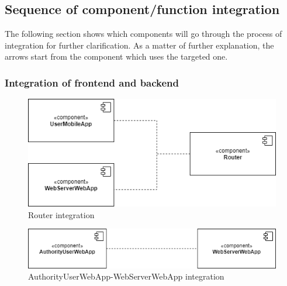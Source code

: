         \subsection{Sequence of component/function integration}
        The following section shows which components will go through the process
        of integration for further clarification. As a matter of further
        explanation, the arrows start from the component which uses the targeted
        one.

        \subsubsection{Integration of frontend and backend}
            \begin{figure}[H]
                \includegraphics[scale=0.7]{dd/resources/images/Integration-Router.png}
                \caption{Router integration}        
            \end{figure}
            \begin{figure}[H]
                \includegraphics[scale=0.65]{dd/resources/images/Integration-Web.png}
                \caption{AuthorityUserWebApp-WebServerWebApp integration}        
            \end{figure}

